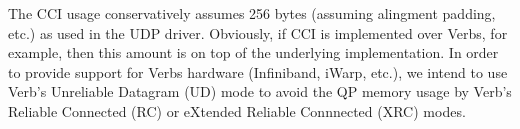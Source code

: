 
The CCI usage conservatively assumes 256 bytes (assuming alingment padding,
etc.) as used in the UDP driver. Obviously, if CCI is implemented over Verbs,
for example, then this amount is on top of the underlying implementation. In
order to provide support for Verbs hardware (Infiniband, iWarp, etc.), we intend
to use Verb's Unreliable Datagram (UD) mode to avoid the QP memory usage by
Verb's Reliable Connected (RC) or eXtended Reliable Connnected (XRC) modes.

